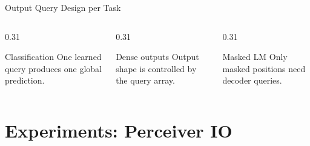 \documentclass[aspectratio=169,11pt]{beamer}
\begin{document}
\begin{frame}[shrink=4]{Output Query Design per Task}
  \vspace{0.2em}
  \begin{columns}[T,onlytextwidth]
    \begin{column}{0.31\textwidth}
      \begin{block}{Classification}
        \scriptsize One learned query produces one global prediction.
      \end{block}
    \end{column}
    \begin{column}{0.31\textwidth}
      \begin{block}{Dense outputs}
        \scriptsize Output shape is controlled by the query array.
      \end{block}
    \end{column}
    \begin{column}{0.31\textwidth}
      \begin{block}{Masked LM}
        \scriptsize Only masked positions need decoder queries.
      \end{block}
    \end{column}
  \end{columns}
\end{frame}



\section{Experiments: Perceiver IO}
\end{document}
